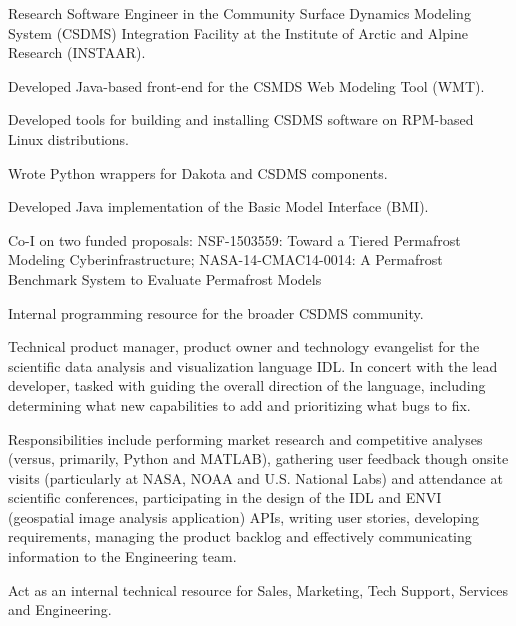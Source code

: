 \documentclass[letterpaper]{resume}
\begin{document}
\begin{compactitem}[\itembullet]
  \item Research Software Engineer in the Community Surface Dynamics
    Modeling System (CSDMS) Integration Facility at the Institute of
    Arctic and Alpine Research (INSTAAR).
  \item Developed Java-based front-end for the CSMDS Web Modeling Tool (WMT).
  \item Developed tools for building and installing CSDMS software on
    RPM-based Linux distributions.
  \item Wrote Python wrappers for Dakota and CSDMS components.
  \item Developed Java implementation of the Basic Model Interface (BMI).
  \item Co-I on two funded proposals: NSF-1503559: Toward a Tiered Permafrost Modeling 
    Cyberinfrastructure; NASA-14-CMAC14-0014: A Permafrost Benchmark System 
    to Evaluate Permafrost Models
  \item Internal programming resource for the broader CSDMS community.
\end{compactitem}

\begin{compactitem}[\itembullet]
  \item Technical product manager, product owner and technology
    evangelist for the scientific data analysis and visualization
    language IDL. In concert with the lead developer, tasked with
    guiding the overall direction of the language, including
    determining what new capabilities to add and prioritizing what
    bugs to fix.
  \item Responsibilities include performing market research and
    competitive analyses (versus, primarily, Python and MATLAB),
    gathering user feedback though onsite visits (particularly at
    NASA, NOAA and U.S. National Labs) and attendance at scientific
    conferences, participating in the design of the IDL and ENVI
    (geospatial image analysis application) APIs, writing user
    stories, developing requirements, managing the product backlog and
    effectively communicating information to the Engineering team.
  \item Act as an internal technical resource for Sales, Marketing,
    Tech Support, Services and Engineering.
\end{compactitem}
\end{document}
